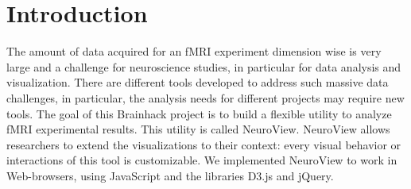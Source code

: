 \documentclass[twocolumn]{bmcart}%
\begin{document}
\begin{frontmatter}
\begin{fmbox}

	








%
\end{fmbox}%

\end{frontmatter}


\section{Introduction}\label{introduction}

The amount of data acquired for an fMRI experiment dimension wise is
very large and a challenge for neuroscience studies, in particular for
data analysis and visualization. There are different tools developed to
address such massive data challenges, in particular, the analysis needs
for different projects may require new tools. The goal of this Brainhack
project is to build a flexible utility to analyze fMRI experimental
results. This utility is called NeuroView. NeuroView allows researchers
to extend the visualizations to their context: every visual behavior or
interactions of this tool is customizable. We implemented NeuroView to
work in Web-browsers, using JavaScript and the libraries D3.js and
jQuery.
\end{document}
